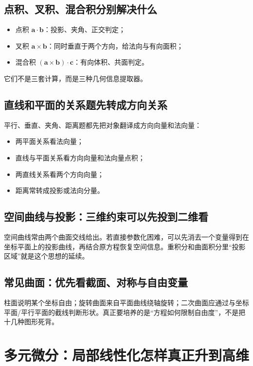 \documentclass[11pt,a4paper,openany]{ctexbook}
\begin{document}
\section{点积、叉积、混合积分别解决什么}
\begin{itemize}
  \item 点积 $\bm a\cdot\bm b$：投影、夹角、正交判定；
  \item 叉积 $\bm a\times\bm b$：同时垂直于两个方向，给法向与有向面积；
  \item 混合积 $(\bm a\times\bm b)\cdot\bm c$：有向体积、共面判定。
\end{itemize}
它们不是三套计算，而是三种几何信息提取器。

\section{直线和平面的关系题先转成方向关系}
平行、垂直、夹角、距离题都先把对象翻译成方向向量和法向量：
\begin{itemize}
  \item 两平面关系看法向量；
  \item 直线与平面关系看方向向量和法向量点积；
  \item 两直线关系看两个方向向量；
  \item 距离常转成投影或法向分量。
\end{itemize}

\section{空间曲线与投影：三维约束可以先投到二维看}
空间曲线常由两个曲面交线给出。若直接参数化困难，可以先消去一个变量得到在坐标平面上的投影曲线，再结合原方程恢复空间信息。重积分和曲面积分里“投影区域”就是这个思想的延续。

\section{常见曲面：优先看截面、对称与自由变量}
柱面说明某个坐标自由；旋转曲面来自平面曲线绕轴旋转；二次曲面应通过与坐标平面/平行平面的截线判断形状。真正要培养的是“方程如何限制自由度”，不是把十几种图形死背。

\chapter{多元微分：局部线性化怎样真正升到高维}
\end{document}
